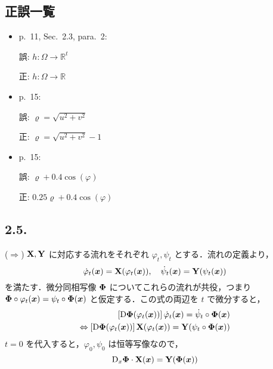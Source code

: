 \documentclass[a4paper,11pt,uplatex]{jsarticle}
\begin{document}
\maketitle
\subsection*{正誤一覧}
\begin{itemize}
    \item p.~11, Sec.~2.3, para.~2: 

    誤: $h:\Omega \to \mathbb{R}^t$

    正: $h:\Omega \to \mathbb{R}$

    \item p.~15: 

    誤: $\varrho = \sqrt{u^2+v^2}$

    正: $\varrho = \sqrt{u^2+v^2}-1$

    \item p.~15: 

    誤: $\varrho + 0.4\cos(\varphi)$

    正: $0.25\varrho + 0.4\cos(\varphi)$

\end{itemize}

\subsection{2.5.}

($\Rightarrow$) ${\bf X}, {\bf Y}$ に対応する流れをそれぞれ ${\varphi}_t, {\psi}_t$ とする．流れの定義より，
\begin{equation}
    \dot{\varphi}_t({\bm x}) = {\bf X}({\varphi}_t({\bm x})), \quad \dot{\psi}_t({\bm x}) = {\bf Y}({\psi}_t({\bm x})) \label{eq: flow}
\end{equation}
を満たす．微分同相写像 ${\bf \Phi}$ についてこれらの流れが共役，つまり
${\bf \Phi} \circ {\varphi}_t ({\bm x}) = {\psi}_t \circ {\bf \Phi}({\bm x})$ と仮定する．この式の両辺を $t$ で微分すると，
\begin{align}
    \left[ {\mathrm D}{\bf \Phi}({\varphi}_t({\bm x})) \right]\dot{\varphi}_t({\bm x}) = \dot{\psi}_t \circ {\bf \Phi}({\bm x}) \nonumber \\
    \Leftrightarrow \left[ {\mathrm D}{\bf \Phi}({\varphi}_t({\bm x})) \right]{\bf X}({\varphi}_t({\bm x})) = {\bf Y}({\psi}_t \circ {\bf \Phi}({\bm x}))
\end{align}
$t=0$ を代入すると，${\varphi}_0, {\psi}_0$ は恒等写像なので，
\begin{equation}
    {\rm D}_x{\bf \Phi}\cdot {\bf X}({\bm x}) = {\bf Y}({\bf \Phi}({\bm x})) \label{diffeo25}
\end{equation}
\end{document}
